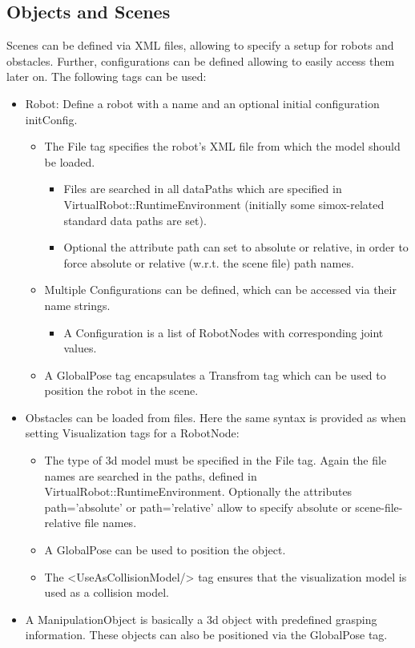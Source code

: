 \subsection{Objects and Scenes}
\par
Scenes can be defined via XML files, allowing to specify a setup for robots and obstacles. Further, configurations can be defined allowing to easily access them later on. The following tags can be used: 
\begin{itemize}
  \item Robot: Define a robot with a name and an optional initial configuration initConfig. 

  \begin{itemize}
    \item The File tag specifies the robot's XML file from which the model should be loaded. 
    \begin{itemize}
    \item Files are searched in all dataPaths which are specified in VirtualRobot::RuntimeEnvironment (initially some simox-related standard data paths are set). 
    \item Optional the attribute path can set to absolute or relative, in order to force absolute or relative (w.r.t. the scene file) path names. 
    \end{itemize}
    \item Multiple Configurations can be defined, which can be accessed via their name strings. 
    \begin{itemize}
    \item A Configuration is a list of RobotNodes with corresponding joint values. 
    \end{itemize}
    \item A GlobalPose tag encapsulates a Transfrom tag which can be used to position the robot in the scene. 
  \end{itemize}

  \item Obstacles can be loaded from files. Here the same syntax is provided as when setting Visualization tags for a RobotNode: 
  \begin{itemize}
       \item The type of 3d model must be specified in the File tag. Again the file names are searched in the paths, defined in VirtualRobot::RuntimeEnvironment. Optionally the attributes path='absolute' or path='relative' allow to specify absolute or scene-file-relative file names.
      \item A GlobalPose can be used to position the object.
      \item The <UseAsCollisionModel/> tag ensures that the visualization model is used as a collision model.
  \end{itemize}
\item A ManipulationObject is basically a 3d object with predefined grasping information. These objects can also be positioned via the GlobalPose tag. 
\end{itemize}
